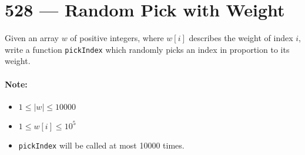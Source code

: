 \section{528 --- Random Pick with Weight}
Given an array $w$ of positive integers, where $w[i]$ describes the weight of index $i$, write a function \texttt{pickIndex} which randomly picks an index in proportion to its weight.

\paragraph{Note:}

\begin{itemize}
\item $1 \leq \lvert w\rvert \leq 10000$
\item $1 \leq w[i] \leq 10^5$
\item \texttt{pickIndex} will be called at most 10000 times.
\end{itemize}